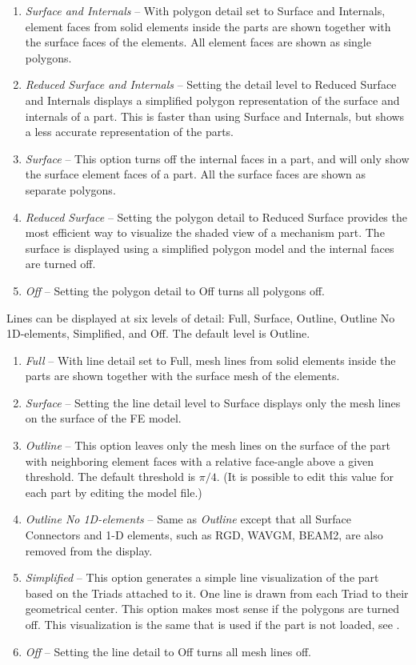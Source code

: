 \begin{enumerate}
\item{\sl Surface and Internals} --
  With polygon detail set to Surface and Internals,
  element faces from solid elements inside the parts are shown
  together with the surface faces of the elements.
  All element faces are shown as single polygons.
\item{\sl Reduced Surface and Internals} --
  Setting the detail level to Reduced Surface and Internals displays
  a simplified polygon representation of the surface and internals of a part.
  This is faster than using Surface and Internals,
  but shows a less accurate representation of the parts.
\item{\sl Surface} --
  This option turns off the internal faces in a part,
  and will only show the surface element faces of a part.
  All the surface faces are shown as separate polygons.
\item{\sl Reduced Surface} --
  Setting the polygon detail to Reduced Surface provides the most efficient way
  to visualize the shaded view of a mechanism part.
  The surface is displayed using a simplified polygon model
  and the internal faces are turned off.
\item{\sl Off} --
  Setting the polygon detail to Off turns all polygons off.
\end{enumerate}

Lines can be displayed at six levels of detail: Full, Surface, Outline, Outline
No 1D-elements, Simplified, and Off. The default level is Outline.

\begin{enumerate}
\item{\sl Full} --
  With line detail set to Full, mesh lines from solid elements inside the parts
  are shown together with the surface mesh of the elements.
\item{\sl Surface} --
  Setting the line detail level to Surface displays only the mesh lines
  on the surface of the FE model.
\item{\sl Outline} --
  This option leaves only the mesh lines on the surface of the part with
  neighboring element faces with a relative face-angle above a given threshold.
  The default threshold is $\pi/4$. (It is possible to edit this
  value for each part by editing the model file.)
\item{\sl Outline No 1D-elements} --
  Same as {\sl Outline} except that all Surface Connectors and 1-D elements,
  such as RGD, WAVGM, BEAM2, are also removed from the display.
\item{\sl Simplified} --
  This option generates a simple line visualization of the part
  based on the Triads attached to it.
  One line is drawn from each Triad to their geometrical center.
  This option makes most sense if the polygons are turned off.
  This visualization is the same that is used if the part is not loaded,
  see .
\item{\sl Off} --
  Setting the line detail to Off turns all mesh lines off.
\end{enumerate}

